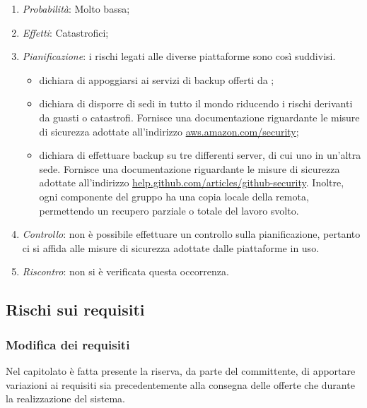 \begin{enumerate}
\item \textit{Probabilità}: Molto bassa;
\item \textit{Effetti}: Catastrofici;
\item \textit{Pianificazione}: i rischi legati alle diverse piattaforme sono così suddivisi.

	\begin{itemize}
	\item {} dichiara di appoggiarsi ai servizi di backup offerti da ;
	\item {} dichiara di disporre di sedi in tutto il mondo riducendo i rischi derivanti da guasti o catastrofi. Fornisce una documentazione riguardante le misure di sicurezza adottate all'indirizzo \url{aws.amazon.com/security};
	\item {} dichiara di effettuare backup su tre differenti server,  di cui uno in un'altra sede. Fornisce una documentazione riguardante le misure di sicurezza adottate all'indirizzo \url{help.github.com/articles/github-security}. Inoltre, ogni componente del gruppo ha una copia locale della  remota, permettendo un recupero parziale o totale del lavoro svolto. 
	\end{itemize}
\item \textit{Controllo}: non è possibile effettuare un controllo sulla pianificazione, pertanto ci si affida alle misure di sicurezza adottate dalle piattaforme in uso.
\item \textit{Riscontro}: non si è verificata questa occorrenza.
\end{enumerate}
	
	\subsection{Rischi sui requisiti}
	
		\subsubsection{Modifica dei requisiti}
		
Nel capitolato è fatta presente la riserva, da parte del committente, di apportare variazioni ai requisiti sia precedentemente alla consegna delle offerte che durante la realizzazione del sistema.


